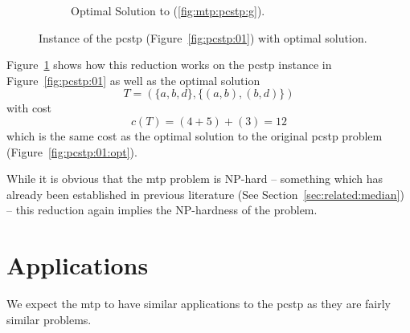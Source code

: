\begin{figure}[h]
  \begin{subfigure}[b]{0.60\linewidth}\centering
    \caption{Optimal Solution to (\ref{fig:mtp:pcstp:g}).}
  \end{subfigure}

  \caption{Instance of the \gls{pcstp} (Figure~\ref{fig:pcstp:01}) with optimal solution.}
  \label{fig:mtp:pcstp}
\end{figure}

Figure~\ref{fig:mtp:pcstp} shows how this reduction works on the \gls{pcstp} instance in Figure~\ref{fig:pcstp:01}
as well as the optimal solution
$$T = (\{a,b,d\}, \{(a,b), (b,d)\})$$
with cost
$$c(T) = (4 + 5) + (3) = 12$$
which is the same cost as the optimal solution to the original \gls{pcstp} problem (Figure~\ref{fig:pcstp:01:opt}).

While it is obvious that the \gls{mtp} problem is NP-hard -- something which has already been established in previous literature
 (See Section~\ref{sec:related:median}) -- this reduction again implies the NP-hardness of the problem.
 \section{Applications}
 We expect the \acrlong{mtp} to have similar applications to the \gls{pcstp} as they are fairly similar problems.

